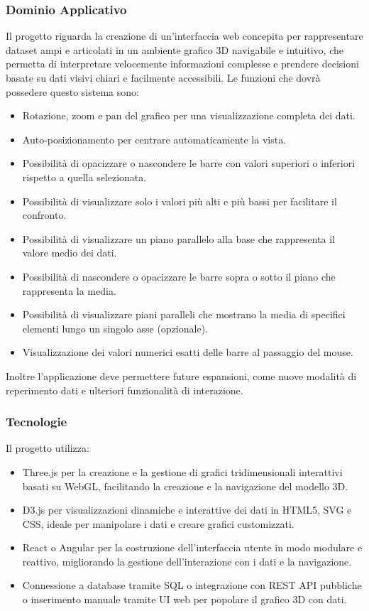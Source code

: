     \subsubsection{Dominio Applicativo}
        Il progetto riguarda la creazione di un’interfaccia web concepita per rappresentare dataset ampi e articolati in un ambiente grafico 3D navigabile e intuitivo, che permetta di interpretare velocemente informazioni complesse e prendere decisioni basate su dati visivi chiari e facilmente accessibili.
        Le funzioni che dovrà possedere questo sistema sono:
        \begin{itemize}
            \item Rotazione, zoom e pan del grafico per una visualizzazione completa dei dati.
            \item Auto-posizionamento per centrare automaticamente la vista.
            \item Possibilità di opacizzare o nascondere le barre con valori superiori o inferiori rispetto a quella selezionata.
            \item Possibilità di visualizzare solo i valori più alti e più bassi per facilitare il confronto.
            \item Possibilità di visualizzare un piano parallelo alla base che rappresenta il valore medio dei dati.
            \item Possibilità di nascondere o opacizzare le barre sopra o sotto il piano che rappresenta la media.
            \item Possibilità di visualizzare piani paralleli che mostrano la media di specifici elementi lungo un singolo asse (opzionale).
            \item Visualizzazione dei valori numerici esatti delle barre al passaggio del mouse.
        \end{itemize}
        Inoltre l’applicazione deve permettere future espansioni, come nuove modalità di reperimento dati e ulteriori funzionalità di interazione.
    \subsubsection{Tecnologie}
        Il progetto utilizza:
        \begin{itemize}
            \item Three.js per la creazione e la gestione di grafici tridimensionali interattivi basati su WebGL, facilitando la creazione e la navigazione del modello 3D.
            \item D3.js per visualizzazioni dinamiche e interattive dei dati in HTML5, SVG e CSS, ideale per manipolare i dati e creare grafici customizzati.
            \item React o Angular per la costruzione dell’interfaccia utente in modo modulare e reattivo, migliorando la gestione dell’interazione con i dati e la navigazione.
            \item Connessione a database tramite SQL o integrazione con REST API pubbliche o inserimento manuale tramite UI web per popolare il grafico 3D con dati.
        \end{itemize}
